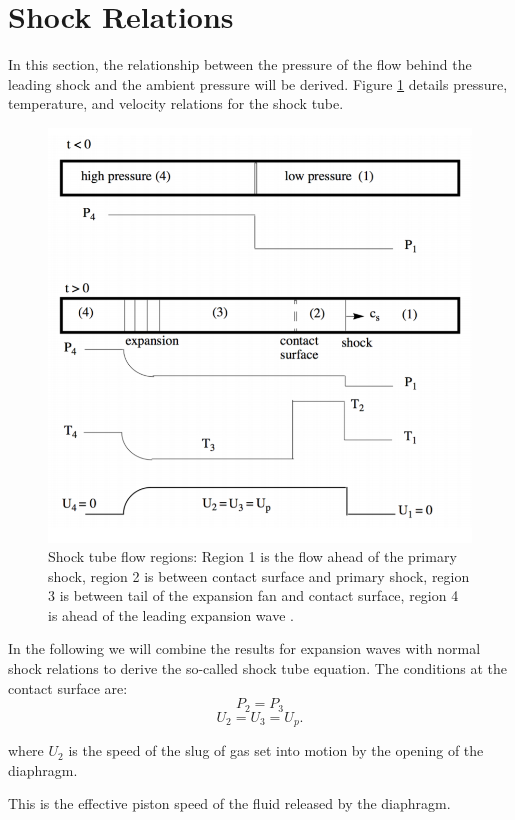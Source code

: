 \section{Shock Relations} \label{app:shock}
In this section, the relationship between the pressure of the flow behind the leading shock and the ambient pressure will be derived. Figure \ref{fig:shock} details pressure, temperature, and velocity relations for the shock tube.

\begin{figure}[H]
	\centering
	\includegraphics[scale=0.5]{figshock.png} 
	\caption{Shock tube flow regions: Region 1 is the flow ahead of the primary shock, region 2 is between contact surface and primary shock, region 3 is between tail of the expansion fan and contact surface, region 4 is ahead of the leading expansion wave \cite{cantwell2017}.}
	\label{fig:shock}
\end{figure}

In the following we will combine the results for expansion waves with normal shock relations to derive the so-called shock tube equation. The conditions at the contact surface are:
\begin{equation}
	P_2 = P_3 
\end{equation}
\begin{equation}
	U_2 = U_3 = U_p.
\end{equation}
\begin{center}
	where $U_2$ is the speed of the slug of gas set into motion by the opening of the diaphragm.
\end{center}
This is the effective piston speed of the fluid released by the diaphragm.

